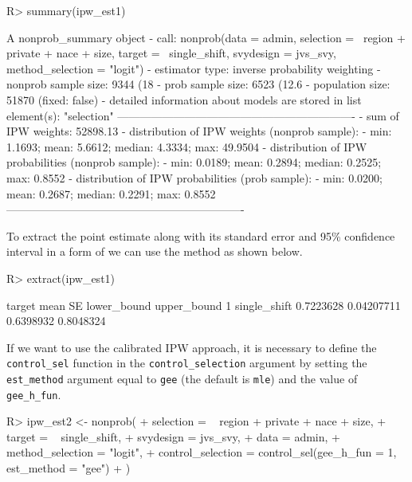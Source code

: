 \documentclass[
]{jss}
\begin{document}
\begin{CodeChunk}
\begin{CodeInput}
R> summary(ipw_est1)
\end{CodeInput}
\begin{CodeOutput}
A nonprob_summary object
 - call: nonprob(data = admin, selection = ~region + private + nace + 
    size, target = ~single_shift, svydesign = jvs_svy, method_selection = "logit")
 - estimator type: inverse probability weighting
 - nonprob sample size: 9344 (18%
 - prob sample size: 6523 (12.6%
 - population size: 51870 (fixed: false)
 - detailed information about models are stored in list element(s): "selection"
----------------------------------------------------------------
 - sum of IPW weights: 52898.13 
 - distribution of IPW weights (nonprob sample):
   - min: 1.1693; mean: 5.6612; median: 4.3334; max: 49.9504
 - distribution of IPW probabilities (nonprob sample):
   - min: 0.0189; mean: 0.2894; median: 0.2525; max: 0.8552
 - distribution of IPW probabilities (prob sample):
   - min: 0.0200; mean: 0.2687; median: 0.2291; max: 0.8552
----------------------------------------------------------------
\end{CodeOutput}
\end{CodeChunk}

To extract the point estimate along with its standard error and 95\%
confidence interval in a form of  we can use the
 method as shown below.

\begin{CodeChunk}
\begin{CodeInput}
R> extract(ipw_est1)
\end{CodeInput}
\begin{CodeOutput}
        target      mean         SE lower_bound upper_bound
1 single_shift 0.7223628 0.04207711   0.6398932   0.8048324
\end{CodeOutput}
\end{CodeChunk}

If we want to use the calibrated IPW approach, it is necessary to define
the \texttt{control\_sel} function in the \texttt{control\_selection}
argument by setting the \texttt{est\_method} argument equal to
\texttt{gee} (the default is \texttt{mle}) and the value of
\texttt{gee\_h\_fun}.

\begin{CodeChunk}
\begin{CodeInput}
R> ipw_est2 <- nonprob(
+   selection = ~ region + private + nace + size,
+   target = ~ single_shift,
+   svydesign = jvs_svy,
+   data = admin,
+   method_selection = "logit",
+   control_selection = control_sel(gee_h_fun = 1, est_method = "gee")
+ )
\end{CodeInput}
\end{CodeChunk}
\end{document}
